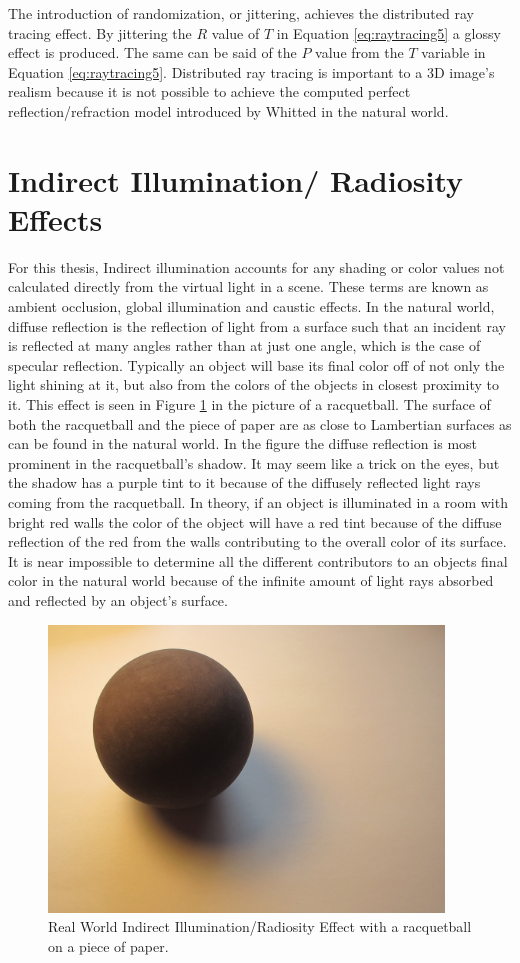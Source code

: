 The introduction of randomization, or jittering, achieves the distributed ray tracing effect. By jittering the ${R}$ value of $T$ in Equation \ref{eq:raytracing5} a glossy effect is produced. The same can be said of the $P$ value from the $T$ variable in Equation \ref{eq:raytracing5}.  Distributed ray tracing is important to a 3D image's realism because it is not possible to achieve the computed perfect reflection/refraction model introduced by Whitted in the natural world.

\section{Indirect Illumination/ Radiosity Effects}
For this thesis, Indirect illumination accounts for any shading or color values not calculated directly from the virtual light in a scene.   These terms are known as ambient occlusion, global illumination and caustic effects. In the natural world, diffuse reflection is the reflection of light from a surface such that an incident ray is reflected at many angles rather than at just one angle, which is the case of specular reflection.  Typically an object will base its final color off of not only the light shining at it, but also from the colors of the objects in closest proximity to it.  This effect is seen in Figure \ref{fig:diffusereflectionrw} in the picture of a racquetball.  The surface of both the racquetball and the piece of paper are as close to Lambertian surfaces as can be found in the natural world.  In the figure the diffuse reflection is most prominent in the racquetball's shadow.  It may seem like a trick on the eyes, but the shadow has a purple tint to it because of the diffusely reflected light rays coming from the racquetball.  In theory, if an object is illuminated in a room with bright red walls the color of the object will have a red tint because of the diffuse reflection of the red from the walls contributing to the overall color of its surface.  It is near impossible to determine all the different contributors to an objects final color in the natural world because of the infinite amount of light rays absorbed and reflected by an object's surface.

\begin{figure}[h]
\centering
\includegraphics[height=3.0in]{figures/raquetball.JPG}
\caption{Real World Indirect Illumination/Radiosity Effect with a racquetball on a piece of paper.}
\label{fig:diffusereflectionrw}
\end{figure}

